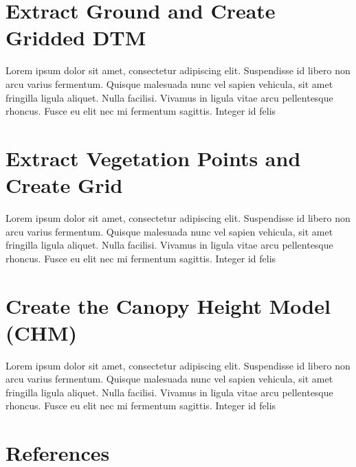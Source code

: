 \documentclass{article}
\begin{document}
\section{Extract Ground and Create Gridded DTM}

Lorem ipsum dolor sit amet, consectetur adipiscing elit. Suspendisse id libero non arcu varius fermentum. Quisque malesuada nunc vel sapien vehicula, sit amet fringilla ligula aliquet. Nulla facilisi. Vivamus in ligula vitae arcu pellentesque rhoncus. Fusce eu elit nec mi fermentum sagittis. Integer id felis
\newpage

\section{Extract Vegetation Points and Create Grid}

Lorem ipsum dolor sit amet, consectetur adipiscing elit. Suspendisse id libero non arcu varius fermentum. Quisque malesuada nunc vel sapien vehicula, sit amet fringilla ligula aliquet. Nulla facilisi. Vivamus in ligula vitae arcu pellentesque rhoncus. Fusce eu elit nec mi fermentum sagittis. Integer id felis
\newpage

\section{Create the Canopy Height Model (CHM)}

Lorem ipsum dolor sit amet, consectetur adipiscing elit. Suspendisse id libero non arcu varius fermentum. Quisque malesuada nunc vel sapien vehicula, sit amet fringilla ligula aliquet. Nulla facilisi. Vivamus in ligula vitae arcu pellentesque rhoncus. Fusce eu elit nec mi fermentum sagittis. Integer id felis
\newpage

\section{References}


\end{document}
